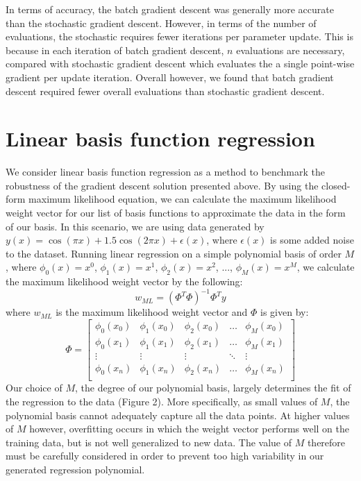 \documentclass{article}
\begin{document}
In terms of accuracy, the batch gradient descent was generally more accurate than the stochastic gradient descent. However, in terms of the number of evaluations, the stochastic requires fewer iterations per parameter update. This is because in each iteration of batch gradient descent, $n$ evaluations are necessary, compared with stochastic gradient descent which evaluates the a single point-wise gradient per update iteration. Overall however, we found that batch gradient descent required fewer overall evaluations than stochastic gradient descent.

\section{Linear basis function regression}
We consider linear basis function regression as a method to benchmark the robustness of the gradient descent solution presented above. By using the closed-form maximum likelihood equation, we can calculate the maximum likelihood weight vector for our list of basis functions to approximate the data in the form of our basis. In this scenario, we are using data generated by $y(x) = \cos(\pi x) + 1.5 \cos(2 \pi x) + \epsilon(x)$, where $\epsilon(x)$ is some added noise to the dataset. Running linear regression on a simple polynomial basis of order $M$, where $\phi_0(x) = x^0$, $\phi_1(x) = x^1$, $\phi_2(x) = x^2$, ..., $\phi_M(x) = x^M$, we calculate the maximum likelihood weight vector by the following:
$$w_{ML} = (\Phi^T \Phi)^{-1} \Phi^T y$$
where $w_{ML}$ is the maximum likelihood weight vector and $\Phi$ is given by:
$$\Phi =
\begin{bmatrix}
  \phi_0(x_0)   & \phi_1(x_0)   & \phi_2(x_0)   & \dots   & \phi_M(x_0) \\
  \phi_0(x_1)   & \phi_1(x_1)   & \phi_2(x_1)   & \dots   & \phi_M(x_1) \\
  \vdots        & \vdots        & \vdots        & \ddots  & \vdots \\
  \phi_0(x_n)   & \phi_1(x_n)   & \phi_2(x_n)   & \dots   & \phi_M(x_n) \\
\end{bmatrix}
$$
Our choice of $M$, the degree of our polynomial basis, largely determines the fit of the regression to the data (Figure 2). More specifically, as small values of $M$, the polynomial basis cannot adequately capture all the data points. At higher values of $M$ however, overfitting occurs in which the weight vector performs well on the training data, but is not well generalized to new data. The value of $M$ therefore must be carefully considered in order to prevent too high variability in our generated regression polynomial.
\end{document}
